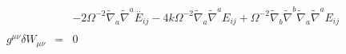 \documentclass[10pt,letterpaper]{article}
\numberwithin{equation}{section}
\begin{document}
\begin{appendices}
\begin{eqnarray}
&& - 2 \Omega^{-2} \tilde{\nabla}_{a}\tilde{\nabla}^{a}\overset{..}{E}_{ij} - 4 k \Omega^{-2} \tilde{\nabla}_{a}\tilde{\nabla}^{a}E_{ij} + \Omega^{-2} \tilde{\nabla}_{b}\tilde{\nabla}^{b}\tilde{\nabla}_{a}\tilde{\nabla}^{a}E_{ij}
\\  \nonumber\\ 
g^{\mu\nu}\delta W_{\mu\nu}&=& 0
\end{eqnarray}
	
\end{appendices}
\end{document}
